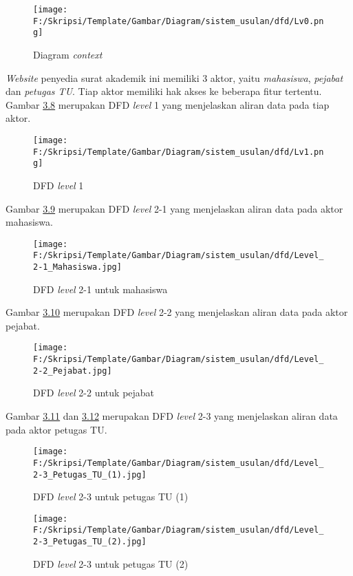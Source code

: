 \begin{figure}[H]
	\centering
		\texttt{[image: F:/Skripsi/Template/Gambar/Diagram/sistem\_usulan/dfd/Lv0.png]}
	\caption{Diagram \textit{context}}
	\label{fig:data_flow}
\end{figure}

\textit{Website} penyedia surat akademik ini memiliki 3 aktor, yaitu \textit{mahasiswa}, \textit{pejabat} dan \textit{petugas TU}. Tiap aktor memiliki hak akses ke beberapa fitur tertentu. Gambar \hyperlink{level_1}{3.8} merupakan DFD \textit{level} 1 yang menjelaskan aliran data pada tiap aktor.

\begin{figure}[H]
	\centering
		\texttt{[image: F:/Skripsi/Template/Gambar/Diagram/sistem\_usulan/dfd/Lv1.png]}
	\caption{DFD \textit{level} 1}
	\label{fig:level_1}
\end{figure}

Gambar \hyperlink{level_2-1}{3.9} merupakan DFD \textit{level} 2-1 yang menjelaskan aliran data pada aktor mahasiswa.

\begin{figure}[H]
	\centering
		\texttt{[image: F:/Skripsi/Template/Gambar/Diagram/sistem\_usulan/dfd/Level\_2-1\_Mahasiswa.jpg]}
	\caption{DFD \textit{level} 2-1 untuk mahasiswa}
	\label{fig:level_2-1}
\end{figure}

Gambar \hyperlink{level_2-2}{3.10} merupakan DFD \textit{level} 2-2 yang menjelaskan aliran data pada aktor pejabat.

\begin{figure}[H]
	\centering
		\texttt{[image: F:/Skripsi/Template/Gambar/Diagram/sistem\_usulan/dfd/Level\_2-2\_Pejabat.jpg]}
	\caption{DFD \textit{level} 2-2 untuk pejabat}
	\label{fig:level_2-2}
\end{figure}

Gambar \hyperlink{level_2-3(1)}{3.11} dan \hyperlink{level_2-3(2)}{3.12} merupakan DFD \textit{level} 2-3 yang menjelaskan aliran data pada aktor petugas TU.

\begin{figure}[H]
	\centering
		\texttt{[image: F:/Skripsi/Template/Gambar/Diagram/sistem\_usulan/dfd/Level\_2-3\_Petugas\_TU\_(1).jpg]}
	\caption{DFD \textit{level} 2-3 untuk petugas TU (1)}
	\label{fig:level_2-3(1)}
\end{figure}

\begin{figure}[H]
	\centering
		\texttt{[image: F:/Skripsi/Template/Gambar/Diagram/sistem\_usulan/dfd/Level\_2-3\_Petugas\_TU\_(2).jpg]}
	\caption{DFD \textit{level} 2-3 untuk petugas TU (2)}
	\label{fig:level_2-3(2)}
\end{figure}

